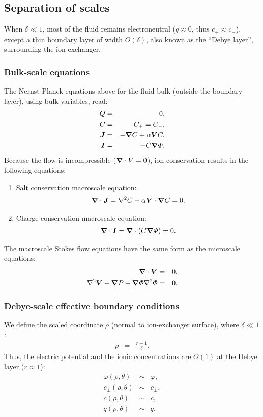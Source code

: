\subsection{Separation of scales}
When $\delta \ll 1$, 
most of the fluid remains electroneutral ($q \approx 0$, thus $c_+ \approx c_-$), 
except a thin boundary layer of width $O(\delta)$, 
also known as the ``Debye layer'', surrounding the ion exchanger. 

\subsubsection  {Bulk-scale equations}
The Nernst-Planck equations above for the fluid bulk (outside
the boundary layer), using bulk variables, read:
\begin{eqnarray}
  Q & = & 0, \\
  C & = & C_+ = C_-, \\
\boldsymbol{J} &=& -\boldsymbol{\nabla} C + \alpha \boldsymbol{V} C, \\
\boldsymbol{I} &=& -C \boldsymbol{\nabla} \varPhi.
\end{eqnarray}
Because the flow is incompressible ($\boldsymbol{\nabla} \cdot V = 0$), 
ion conservation results in the following equations:

\begin{enumerate}
\item Salt conservation macroscale equation:
\begin{eqnarray}
\boldsymbol{\nabla} \cdot \boldsymbol{J} = \nabla^2 C - \alpha \boldsymbol{V} \cdot \boldsymbol{\nabla} C = 0. 
\end{eqnarray}

\item Charge conservation macroscale equation:
\begin{eqnarray}
\boldsymbol{\nabla} \cdot \boldsymbol{I} = \boldsymbol{\nabla} \cdot \left( C \boldsymbol{\nabla} \varPhi \right) = 0.
\end{eqnarray}
\end{enumerate}

The macroscale Stokes flow equations have the same form as the microscale equations:
\begin{eqnarray}
\boldsymbol{\nabla} \cdot \boldsymbol{V} &=& 0, \\
\nabla^2 \boldsymbol{V} - \boldsymbol{\nabla} P + \boldsymbol{\nabla} \varPhi \nabla^2 \varPhi &=& 0.
\end{eqnarray}

\subsubsection{Debye-scale effective boundary conditions}
We define the scaled coordinate $\rho$ (normal to ion-exchanger surface), where $\delta \ll 1$:
\begin{eqnarray}
  \rho &=& \frac{r-1}{\delta}. 
\end{eqnarray}
Thus, the electric potential and the ionic concentrations are $O(1)$ at the Debye layer ($r \approx 1$):
\begin{eqnarray}
  \varphi(\rho,\theta) &\sim& \varphi, \\
  c_\pm(\rho,\theta) &\sim& c_\pm, \\
  c(\rho,\theta) &\sim& c, \\
  q(\rho,\theta) &\sim& q.
\end{eqnarray}

